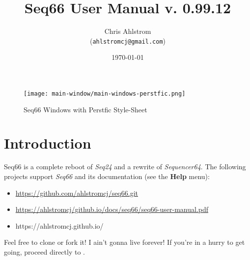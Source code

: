 \documentclass[
 11pt,
 twoside,
 a4paper,
 final                                 %
]{article}
\begin{document}
\title{Seq66 User Manual v. 0.99.12}
\author{Chris Ahlstrom \\
   (\texttt{ahlstromcj@gmail.com})}
\date{\today}
\maketitle

\begin{figure}[H]
   \centering 
   \texttt{[image: main-window/main-windows-perstfic.png]}
   \caption*{Seq66 Windows with Perstfic Style-Sheet}
\end{figure}

\clearpage                             %

\tableofcontents
\listoffigures                         %
\listoftables                          %

%

\parindent 0pt
\parskip 9pt

\rhead{\rightmark}         %

\section{Introduction}
\label{sec:introduction}

   Seq66 is a complete reboot of \textsl{Seq24} and a rewrite of
   \textsl{Sequencer64}.
   The following projects support \textsl{Seq66} and its documentation (see
   the \textbf{Help} menu):

   \begin{itemize}
      \item \url{https://github.com/ahlstromcj/seq66.git}
      \item \url{https://ahlstromcj/github.io/docs/seq66/seq66-user-manual.pdf}
      \item https://ahlstromcj.github.io/
   \end{itemize}

   Feel free to clone or fork it!
   I ain't gonna live forever!
   If you're in a hurry to get going, proceed directly to
   .
\end{document}
